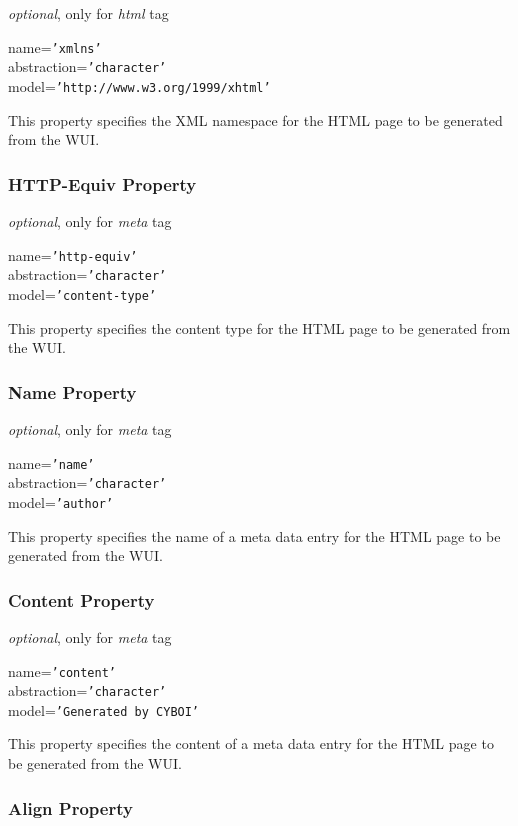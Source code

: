 \emph{optional}, only for \emph{html} tag

name=\texttt{'xmlns'}\\
abstraction=\texttt{'character'}\\
model=\texttt{'http://www.w3.org/1999/xhtml'}

This property specifies the XML namespace for the HTML page to be generated
from the WUI.

\subsubsection{HTTP-Equiv Property}

\emph{optional}, only for \emph{meta} tag

name=\texttt{'http-equiv'}\\
abstraction=\texttt{'character'}\\
model=\texttt{'content-type'}

This property specifies the content type for the HTML page to be generated from
the WUI.

\subsubsection{Name Property}

\emph{optional}, only for \emph{meta} tag

name=\texttt{'name'}\\
abstraction=\texttt{'character'}\\
model=\texttt{'author'}

This property specifies the name of a meta data entry for the HTML page to be
generated from the WUI.

\subsubsection{Content Property}

\emph{optional}, only for \emph{meta} tag

name=\texttt{'content'}\\
abstraction=\texttt{'character'}\\
model=\texttt{'Generated by CYBOI'}

This property specifies the content of a meta data entry for the HTML page to
be generated from the WUI.

\subsubsection{Align Property}


